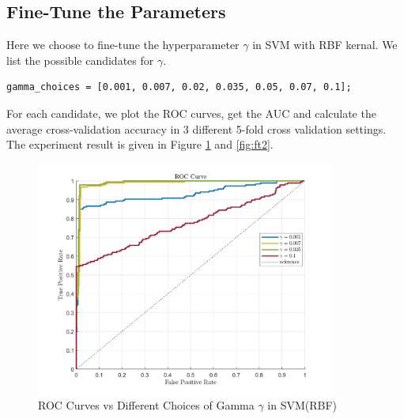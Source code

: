 \documentclass[a4paper,12pt]{article} %
\begin{document}
\subsection{Fine-Tune the Parameters}
\hspace{0.7cm}
Here we choose to fine-tune the hyperparameter $\gamma$ in SVM with RBF kernal. We list the possible candidates for $\gamma$.

\begin{footnotesize}
\begin{verbatim}
gamma_choices = [0.001, 0.007, 0.02, 0.035, 0.05, 0.07, 0.1];
\end{verbatim}
\end{footnotesize}

\hspace{0.7cm}
For each candidate, we plot the ROC curves, get the AUC and calculate the average cross-validation accuracy in 3 different 5-fold cross validation settings. The experiment result is given in Figure \ref{fig:ft} and \ref{fig:ft2}.


\begin{figure}[!htbp]
	\centering
	\includegraphics[width=0.88\textwidth]{FT.jpg}
	\caption{ROC Curves vs Different Choices of Gamma $\gamma$ in SVM(RBF)}
	\label{fig:ft}
\end{figure}
\end{document}

